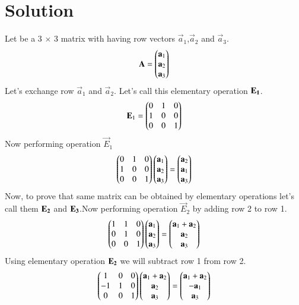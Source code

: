 \documentclass[journal,12pt,twocolumn]{IEEEtran}
\begin{document}
 \section{\textbf{Solution}}
 Let  be a 3 $\times$ 3 matrix with having row vectors $\vec{a}_1$,$\vec{a}_2$ and $\vec{a}_3$.
 \begin{align}
 \mathbf{A}=\begin{pmatrix}\mathbf{a}_{1}\\\mathbf{a}_{2}\\\mathbf{a}_{3}\end{pmatrix}
   \end{align}
  Let's exchange row $\vec{a}_1$ and $\vec{a}_2$. Let's call this elementary operation $\bf{E}_1$.
  \begin{align}
  \mathbf{E}_1=\begin{pmatrix}0&1&0\\1&0&0\\0&0&1\end{pmatrix}\\
  \end{align}
  Now performing operation $ \vec{E}_1$
  \begin{align}
  \begin{pmatrix}0&1&0\\1&0&0\\0&0&1\end{pmatrix}\begin{pmatrix}\mathbf{a}_{1}\\\mathbf{a}_{2}\\\mathbf{a}_{3}\end{pmatrix}=
\begin{pmatrix}\mathbf{a}_2\\\mathbf{a}_1\\\mathbf{a}_3\end{pmatrix}\label{a}
  \end{align}
  Now, to prove that same matrix can be obtained by elementary operations let's call them $\bf{E}_2$ and $\bf{E}_3$.Now performing operation $ \vec{E}_2$ by adding row 2 to row 1.
  \begin{align}
  \begin{pmatrix}1&1&0\\0&1&0\\0&0&1\end{pmatrix}\begin{pmatrix}\mathbf{a}_{1}\\\mathbf{a}_{2}\\\mathbf{a}_{3}\end{pmatrix}
  =\begin{pmatrix}\mathbf{a}_1+\mathbf{a}_2\\\mathbf{a}_2\\\mathbf{a}_3\end{pmatrix}
  \end{align}
  Using elementary operation $\bf{E}_2$ we will subtract row 1 from row 2.
  \begin{align}
  \begin{pmatrix}1&0&0\\-1&1&0\\0&0&1\end{pmatrix}\begin{pmatrix}\mathbf{a}_1+\mathbf{a}_2\\\mathbf{a}_2\\\mathbf{a}_3\end{pmatrix}=
  \begin{pmatrix}\mathbf{a}_1+\mathbf{a}_2\\-\mathbf{a}_1\\\mathbf{a}_3\end{pmatrix}
  \end{align}
\end{document}
